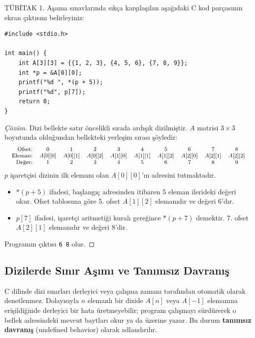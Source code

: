 \begin{example}
TÜBİTAK 1. Aşama sınavlarında sıkça karşılaşılan aşağıdaki C kod parçasının ekran çıktısını belirleyiniz:
\begin{lstlisting}[language=CTemel]
#include <stdio.h>

int main() {
    int A[3][3] = {{1, 2, 3}, {4, 5, 6}, {7, 8, 9}};
    int *p = &A[0][0];
    printf("%d ", *(p + 5));
    printf("%d", p[7]);
    return 0;
}
\end{lstlisting}
\end{example}

\begin{proof}[Çözüm]
Dizi bellekte satır öncelikli sırada ardışık dizilmiştir. $A$ matrisi $3 \times 3$ boyutunda olduğundan bellekteki yerleşim sırası şöyledir:
\[
\footnotesize\begin{array}{rccccccccc}
\text{Ofset:} & 0 & 1 & 2 & 3 & 4 & 5 & 6 & 7 & 8 \\
\text{Eleman:} & A[0][0] & A[0][1] & A[0][2] & A[1][0] & A[1][1] & A[1][2] & A[2][0] & A[2][1] & A[2][2] \\
\text{Değer:} & 1 & 2 & 3 & 4 & 5 & 6 & 7 & 8 & 9 \\
\end{array}
\]
$p$ işaretçisi dizinin ilk elemanı olan $A[0][0]$'ın adresini tutmaktadır.
\begin{itemize}
    \item $*(p + 5)$ ifadesi, başlangıç adresinden itibaren 5 eleman ilerideki değeri okur. Ofset tablosuna göre 5. ofset $A[1][2]$ elemanıdır ve değeri $6$'dır.
    \item $p[7]$ ifadesi, işaretçi aritmetiği kuralı gereğince $*(p + 7)$ demektir. 7. ofset $A[2][1]$ elemanıdır ve değeri $8$'dir.
\end{itemize}
Programın çıktısı \texttt{6 8} olur.
\end{proof}

\subsection{Dizilerde Sınır Aşımı ve Tanımsız Davranış}

C dilinde dizi sınırları derleyici veya çalışma zamanı tarafından otomatik olarak denetlenmez. Dolayısıyla $n$ elemanlı bir dizide $A[n]$ veya $A[-1]$ elemanına erişildiğinde derleyici bir hata üretmeyebilir; program çalışmayı sürdürerek o bellek adresindeki mevcut baytları okur ya da üzerine yazar. Bu durum \textbf{tanımsız davranış} (undefined behavior) olarak adlandırılır.

